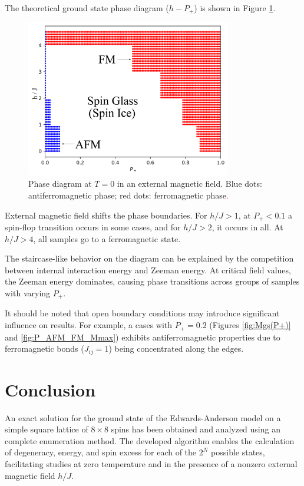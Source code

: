 \documentclass[preprint,12pt]{elsarticle}
\begin{document}
	The theoretical ground state phase diagram ($h-P_+$) is shown in Figure \ref{fig:P+_afm_fm(H)}.
	
	\begin{figure}[H]
		\centering
		\includegraphics[width=0.8\textwidth]{images/P+_afm_fm(H)_filled.png}
		\caption{Phase diagram at $T = 0$ in an external magnetic field. Blue dots: antiferromagnetic phase; red dots: ferromagnetic phase\textcolor{red}{.}}
		\label{fig:P+_afm_fm(H)}
	\end{figure}
	
	External magnetic field shifts the phase boundaries. For $h/J > 1$, at $P_+ < 0.1$ a spin-flop transition occurs in some cases, and for $h/J > 2$, it occurs in all. At $h/J > 4$, all samples go to a ferromagnetic state.
	
	The staircase-like behavior on the diagram can be explained by the competition between internal interaction energy and Zeeman energy. At critical field values, the Zeeman energy dominates, causing phase transitions across groups of samples with varying $P_+$.
	
	It should be noted that open boundary conditions may introduce significant influence on results. For example, a cases with $P_+ = 0.2$ (Figures \ref{fig:Mgs(P+)} and \ref{fig:P_AFM_FM_Mmax}) exhibits antiferromagnetic properties due to ferromagnetic bonds ($J_{ij} = 1$) being concentrated along the edges.
	
	\section{Conclusion}
	
	An exact solution for the ground state of the Edwards-Anderson model on a simple square lattice of $8 \times 8$ spins has been obtained and analyzed using an complete enumeration method. The developed algorithm enables the calculation of degeneracy, energy, and spin excess for each of the $2^N$ possible states, facilitating studies at zero temperature and in the presence of a nonzero external magnetic field $h/J$.
	
\end{document}

